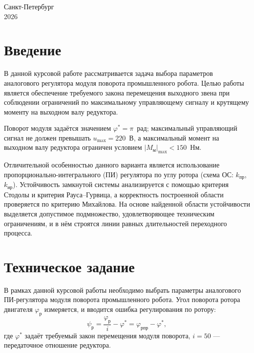 \documentclass[a4paper]{extarticle}
\begin{document}
\begin{center}\small{Санкт-Петербург}\\2026\end{center}
\thispagestyle{empty}

\newpage
\renewcommand{\contentsname}{Содержание}
\tableofcontents

\newpage
{}
{}
\section*{Введение}

В данной курсовой работе рассматривается задача выбора параметров аналогового
регулятора модуля поворота промышленного робота. Целью работы является обеспечение
требуемого закона перемещения выходного звена при соблюдении ограничений по
максимальному управляющему сигналу и крутящему моменту на выходном валу редуктора.

Поворот модуля задаётся значением $\varphi^*=\pi$~рад; максимальный управляющий
сигнал не должен превышать $u_{\max}=220$~В, а максимальный момент на выходном валу
редуктора ограничен условием $|M_{\text{м}}|_{\max}<150$~Нм.

Отличительной особенностью данного варианта является использование
пропорционально-интегрального (ПИ) регулятора по углу ротора (схема ОС:
$k_{\text{пр}}$, $k_{\text{ир}}$). Устойчивость замкнутой системы анализируется с
помощью критерия Стодолы и критерия Рауса--Гурвица, а корректность построенной
области проверяется по критерию Михайлова. На основе найденной области устойчивости
выделяется допустимое подмножество, удовлетворяющее техническим ограничениям, и
в нём строятся линии равных длительностей переходного процесса.

\newpage
{}
{}
\section*{Техническое задание}

В рамках данной курсовой работы необходимо выбрать параметры аналогового
ПИ-регулятора модуля поворота промышленного робота. Угол поворота ротора двигателя
$\varphi_{\text{р}}$ измеряется, и вводится ошибка регулирования по ротору:
\[
\psi_{\text{р}} = \frac{\varphi_{\text{р}}}{i} - \varphi^*
    = \varphi_{\text{рпр}} - \varphi^*,
\]
где $\varphi^*$ задаёт требуемый закон перемещения модуля поворота, $i=50$ ---
передаточное отношение редуктора.
\end{document}
